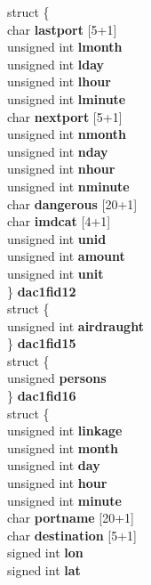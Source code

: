 \begin{DoxyCompactItemize}
{\begin{tabbing}
{\>\>\>struct \{\\
\>\>\>\>char {\bfseries lastport} \mbox{[}5+1\mbox{]}\\
\>\>\>\>unsigned int {\bfseries lmonth}\\
\>\>\>\>unsigned int {\bfseries lday}\\
\>\>\>\>unsigned int {\bfseries lhour}\\
\>\>\>\>unsigned int {\bfseries lminute}\\
\>\>\>\>char {\bfseries nextport} \mbox{[}5+1\mbox{]}\\
\>\>\>\>unsigned int {\bfseries nmonth}\\
\>\>\>\>unsigned int {\bfseries nday}\\
\>\>\>\>unsigned int {\bfseries nhour}\\
\>\>\>\>unsigned int {\bfseries nminute}\\
\>\>\>\>char {\bfseries dangerous} \mbox{[}20+1\mbox{]}\\
\>\>\>\>char {\bfseries imdcat} \mbox{[}4+1\mbox{]}\\
\>\>\>\>unsigned int {\bfseries unid}\\
\>\>\>\>unsigned int {\bfseries amount}\\
\>\>\>\>unsigned int {\bfseries unit}\\
\>\>\>\} {\bfseries dac1fid12}\\
\>\>\>struct \{\\
\>\>\>\>unsigned int {\bfseries airdraught}\\
\>\>\>\} {\bfseries dac1fid15}\\
\>\>\>struct \{\\
\>\>\>\>unsigned {\bfseries persons}\\
\>\>\>\} {\bfseries dac1fid16}\\
\>\>\>struct \{\\
\>\>\>\>unsigned int {\bfseries linkage}\\
\>\>\>\>unsigned int {\bfseries month}\\
\>\>\>\>unsigned int {\bfseries day}\\
\>\>\>\>unsigned int {\bfseries hour}\\
\>\>\>\>unsigned int {\bfseries minute}\\
\>\>\>\>char {\bfseries portname} \mbox{[}20+1\mbox{]}\\
\>\>\>\>char {\bfseries destination} \mbox{[}5+1\mbox{]}\\
\>\>\>\>signed int {\bfseries lon}\\
\>\>\>\>signed int {\bfseries lat}\\
}
\end{tabbing}}
\end{DoxyCompactItemize}
